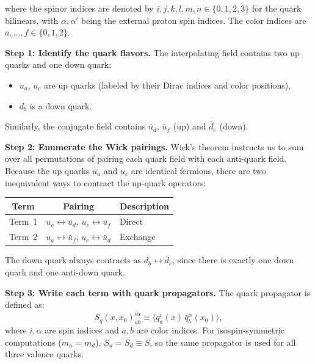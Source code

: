 \documentclass[11pt,a4paper]{article}
\begin{document}
where the spinor indices are denoted by $i,j,k,l,m,n \in \{0,1,2,3\}$ for the quark
bilinears, with $\alpha,\alpha'$ being the external proton spin indices. The color
indices are $a,\dots,f \in \{0,1,2\}$.

\medskip\noindent
\textbf{Step 1: Identify the quark flavors.}
The interpolating field contains two up quarks and one down quark:
\begin{itemize}
  \item $u_a$, $u_c$ are up quarks (labeled by their Dirac indices and color positions),
  \item $d_b$ is a down quark.
\end{itemize}
Similarly, the conjugate field contains $\bar{u}_d$, $\bar{u}_f$ (up) and $\bar{d}_e$
(down).

\medskip\noindent
\textbf{Step 2: Enumerate the Wick pairings.}
Wick's theorem instructs us to sum over all permutations of pairing each quark field
with each anti-quark field. Because the up quarks $u_a$ and $u_c$ are identical
fermions, there are two inequivalent ways to contract the up-quark operators:

\begin{center}
  \begin{tabular}{c|c|l}
    Term & Pairing & Description \\
    \hline
    Term~1 & $u_a \leftrightarrow \bar{u}_d$, $u_c \leftrightarrow \bar{u}_f$ & Direct \\
    Term~2 & $u_a \leftrightarrow \bar{u}_f$, $u_c \leftrightarrow \bar{u}_d$ & Exchange \\
  \end{tabular}
\end{center}

The down quark always contracts as $d_b \leftrightarrow \bar{d}_e$, since there is
exactly one down quark and one anti-down quark.

\medskip\noindent
\textbf{Step 3: Write each term with quark propagators.}
The quark propagator is defined as:
\begin{equation}
  S_q(x, x_0)^{i\alpha}_{ab} \equiv \langle q_a^i(x) \, \bar{q}_b^\alpha(x_0) \rangle,
\end{equation}
where $i,\alpha$ are spin indices and $a,b$ are color indices. For isospin-symmetric
computations ($m_u = m_d$), $S_u = S_d \equiv S$, so the same propagator is used
for all three valence quarks.
\end{document}
